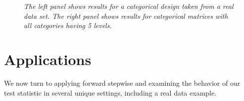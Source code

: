 \documentclass{imsart}
\begin{document}
\begin{figure}[h]
\begin{center}
\hspace{-15pt}
\caption{\small \it The left panel shows results for a categorical design
taken from a real data set.
The right panel shows results for categorical matrices with all categories having 5 levels.}
\end{center}
\end{figure}






\section{Applications}
\label{sec:applications}
We now turn to applying forward stepwise and examining the behavior of
our test statistic in several unique settings, including a real data
example.
\end{document}

